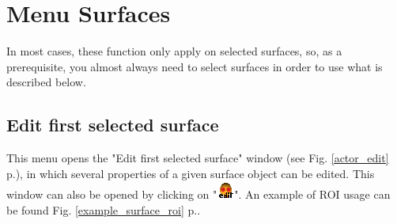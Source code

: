 
\chapter{Menu Surfaces}\label{Menu_surfaces}
\minitoc 


In most cases, these function only apply on selected surfaces, so, as a prerequisite, you almost always need to select surfaces in order to use what is described below.

\section{Edit first selected surface}
This menu opens the "Edit first selected surface" window (see Fig. \ref{actor_edit} p.\pageref{actor_edit}), in which several properties of a given surface object can be edited. This window can also be opened by clicking on "\includegraphics[scale=0.7]{images/06/objects/actor_edit.png}". An example of ROI usage can be found Fig. \ref{example_surface_roi} p.\pageref{example_surface_roi}.







